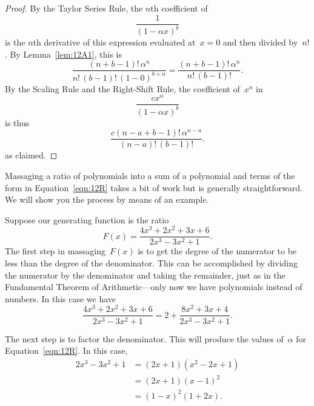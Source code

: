 \begin{proof}
By the Taylor Series Rule, the $n$th coefficient of
\begin{equation*}
    \frac{1}{(1 - \alpha x)^b}
\end{equation*}
is the $n$th derivative of this expression evaluated at~$x = 0$ and
then divided by~$n!$.  By Lemma~\ref{lem:12A1}, this is
\begin{equation*}
\frac{ (n + b - 1)! \, \alpha^n }
     { n! \, (b - 1)! \, (1 - 0)^{b + n} }
  =
\frac{ (n + b - 1)! \, \alpha^n }
     { n! \, (b - 1)! }.
\end{equation*}
By the Scaling Rule and the Right-Shift Rule, the coefficient of~$x^n$
in 
\begin{equation*}
\frac{ c x^\alpha }{ (1 - \alpha x)^b }
\end{equation*}
is thus
\begin{equation*}
    \frac{ c (n - a + b - 1)! \, \alpha^{n - a} }
         { (n - a)! \, (b - 1)! }.
\end{equation*}
as claimed.
\end{proof}

Massaging a ratio of polynomials into a sum of a polynomial and terms
of the form in Equation~\ref{eqn:12R} takes a bit of work but is
generally straightforward.  We will show you the process by means of
an example.

Suppose our generating function is the ratio
\begin{equation}\label{eqn:12T2}
    F(x) = \frac{4 x^3 + 2 x^2 + 3 x + 6}{2 x^3 - 3 x^2 + 1}.
\end{equation}
The first step in massaging~$F(x)$ is to get the degree of the
numerator to be less than the degree of the denominator.  This can be
accomplished by dividing the numerator by the denominator and taking
the remainder, just as in the Fundamental Theorem of Arithmetic---only
now we have polynomials instead of numbers.  In this case we have
\begin{equation*}
\frac{4 x^3 + 2 x^2 + 3 x + 6}{2 x^3 - 3 x^2 + 1}
    = 2 + \frac{8 x^2 + 3 x + 4}{2 x^3 - 3 x^2 + 1}.
\end{equation*}

The next step is to factor the denominator.  This will produce the
values of~$\alpha$ for Equation~\ref{eqn:12R}.  In this case,
\begin{align*}
2 x^3 - 3 x^2 + 1
    &= (2 x + 1) (x^2 - 2 x + 1) \\
    &= (2 x + 1) (x - 1)^2 \\
    &= (1 - x)^2 (1 + 2 x).
\end{align*}

